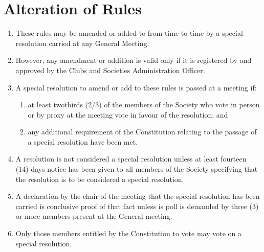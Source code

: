 \documentclass[a4paper]{article}
\begin{document}
\section{Alteration of Rules}
\begin{enumerate}
\item These rules may be amended or added to from time to time by a special resolution carried at any General Meeting.
\item However, any amendment or addition is valid only if it is registered by and approved by the Clubs and Societies Administration Officer.
\item A special resolution to amend or add to these rules is passed at a meeting if:
	\begin{enumerate}
	\item at least two\textendash thirds (2/3) of the members of the Society who vote in person or by proxy at the meeting vote in favour of the resolution; and
	\item any additional requirement of the Constitution relating to the passage of a special resolution have been met.
	\end{enumerate}
\item A resolution is not considered a special resolution unless at least fourteen (14) days notice has been given to all members of the Society specifying that the resolution is to be considered a special resolution.
\item A declaration by the chair of the meeting that the special resolution has been carried is conclusive proof of that fact unless is poll is demanded by three (3) or more members present at the General meeting.
\item Only those members entitled by the Constitution to vote may vote on a special resolution.
\end{enumerate}
\end{document}
